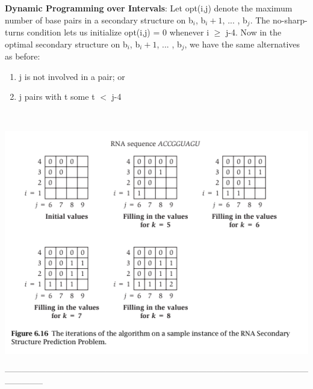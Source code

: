 \documentclass{article}
\begin{document}
\textbf{Dynamic Programming over Intervals}: Let opt(i,j) denote the maximum number of base pairs in a secondary structure on b$_i$, b$_i+1$, ... , b$_j$. The no-sharp-turns condition lets us initialize opt(i,j) = 0 whenever i $\ge$ j-4. Now in the optimal secondary structure on b$_i$, b$_i+1$, ... , b$_j$, we have the same alternatives as before:\\

\begin{enumerate}
    \item j is not involved in a pair; or
    \item j pairs with t some t $<$ j-4
\end{enumerate}

\\

\begin{center}
    \includegraphics[]{figures/fig20.png}
\end{center}

\medskip
--------------------------------------------------------------------------------------------------------------------------
\medskip
\end{document}
